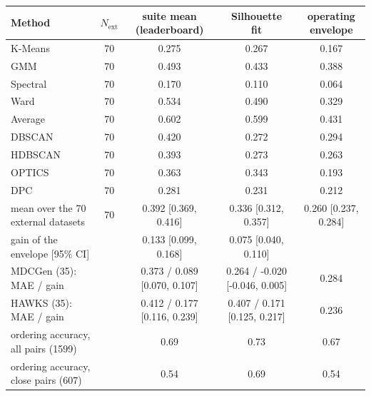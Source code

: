 \begin{tabular}{@{}>{\raggedright\arraybackslash}p{4.2cm}cccc@{}}
\toprule
Method & $N_{\text{ext}}$ & \shortstack{suite mean\\(leaderboard)} & \shortstack{Silhouette\\fit} & \shortstack{operating\\envelope} \\
\midrule
K-Means & 70 & 0.275 & 0.267 & 0.167 \\
GMM & 70 & 0.493 & 0.433 & 0.388 \\
Spectral & 70 & 0.170 & 0.110 & 0.064 \\
Ward & 70 & 0.534 & 0.490 & 0.329 \\
Average & 70 & 0.602 & 0.599 & 0.431 \\
DBSCAN & 70 & 0.420 & 0.272 & 0.294 \\
HDBSCAN & 70 & 0.393 & 0.273 & 0.263 \\
OPTICS & 70 & 0.363 & 0.343 & 0.193 \\
DPC & 70 & 0.281 & 0.231 & 0.212 \\
\midrule
mean over the 70 external datasets & 70 & 0.392 [0.369, 0.416] & 0.336 [0.312, 0.357] & 0.260 [0.237, 0.284] \\
gain of the envelope [95\% CI] & & 0.133 [0.099, 0.168] & 0.075 [0.040, 0.110] & \\
\quad MDCGen (35): MAE / gain & & 0.373 / 0.089 [0.070, 0.107] & 0.264 / -0.020 [-0.046, 0.005] & 0.284 \\
\quad HAWKS (35): MAE / gain & & 0.412 / 0.177 [0.116, 0.239] & 0.407 / 0.171 [0.125, 0.217] & 0.236 \\
ordering accuracy, all pairs (1599) & & 0.69 & 0.73 & 0.67 \\
ordering accuracy, close pairs (607) & & 0.54 & 0.69 & 0.54 \\
\bottomrule
\end{tabular}
